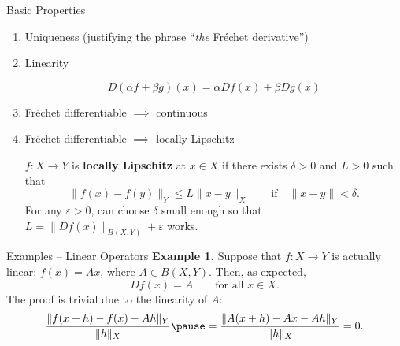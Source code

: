 \documentclass[]{beamer}
\begin{document}
	\begin{frame}{Basic Properties}
		\begin{enumerate}
			\item Uniqueness (justifying the phrase ``\textit{the} Fréchet derivative'')
			\pause
			\vfill
			
			\item Linearity
			
			\begin{equation*}
				D(\alpha f + \beta g)(x) = \alpha Df(x) + \beta Dg(x)
			\end{equation*}
			\pause
			\vfill
			
			\item Fréchet differentiable $\implies$ continuous
			\pause
			\vfill 
			
			\item Fréchet differentiable $\implies$ locally Lipschitz
			
			$f : X \to Y$ is \textbf{locally Lipschitz} at $x \in X$ if there exists $\delta > 0$ and $L > 0$ such that
			\begin{equation*}
				\lVert f(x) - f(y)\rVert_Y \le L\lVert x-y \rVert_X \qquad \text{if} \quad \lVert x - y\rVert < \delta.
			\end{equation*}
			\pause
			For any $\varepsilon > 0$, can choose $\delta$ small enough so that $L = \lVert Df(x) \rVert_{B(X,Y)} + \varepsilon$ works.
		\end{enumerate}
	\end{frame}
	
	\begin{frame}{Examples -- Linear Operators}
		\textbf{Example 1.} Suppose that $f: X \to Y$ is actually linear: $f(x) = Ax$, where $A \in B(X,Y)$. Then, as expected,
		\begin{equation*}
			Df(x) = A \qquad \text{for all } x \in X.
		\end{equation*}
		\pause
		\vfill
		The proof is trivial due to the linearity of $A$:
		\begin{equation*}
			\frac{\lVert f(x+h)-f(x) - Ah\rVert_Y}{\lVert h\rVert_X} \pause= \frac{\lVert A(x+h) - Ax - Ah\lVert_Y}{\lVert h\rVert_X} = 0.
		\end{equation*}
	\end{frame}
	
\end{document}
